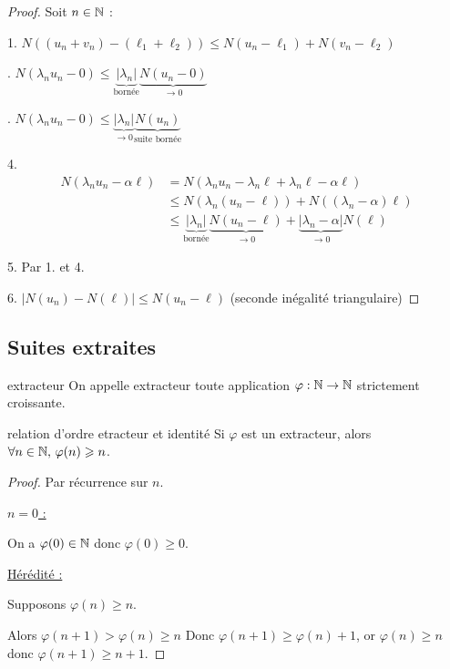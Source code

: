 \begin{proof}
    Soit $n \in \mathbb{N}$ :

    1. $N((u_n + v_n) - (\ell_1 + \ell_2)) \leqslant N(u_n - \ell_1) + N(v_n - \ell_2)$

    . $N(\lambda_n u_n- 0) \leqslant \underbrace{|\lambda_n|}_{\text{bornée}} \underbrace{N(u_n - 0)}_{\rightarrow 0}$

    . $N(\lambda_n u_n - 0) \leqslant \underbrace{|\lambda_n|}_{\rightarrow 0} \underbrace{N(u_n)}_{\text{suite bornée}}$

    4. \begin{align*}
        N(\lambda_n u_n - \alpha \ell) & = N(\lambda_n u_n - \lambda_n \ell + \lambda_n \ell - \alpha \ell) \\
        & \leqslant N(\lambda_n (u_n - \ell)) + N((\lambda_n - \alpha) \ell) \\
        & \leqslant \underbrace{|\lambda_n|}_{\text{bornée}} \underbrace{N(u_n - \ell)}_{\rightarrow 0} + \underbrace{|\lambda_n - \alpha|}_{\rightarrow 0} N(\ell) 
    \end{align*}


    5. Par 1. et 4.

    6. $|N(u_n) - N(\ell)| \leqslant N(u_n - \ell)$ (seconde inégalité triangulaire)

\end{proof}


\subsection{Suites extraites}

\begin{definition}{extracteur}{}
    On appelle extracteur toute application $\varphi : \mathbb{N} \to \mathbb{N}$ strictement croissante.
\end{definition}

\begin{proposition}{relation d'ordre etracteur et identité}{}
    Si $\varphi$ est un extracteur, alors $\forall n \in \mathbb{N}, \, \varphi(n) \geqslant n$.
\end{proposition}



\begin{proof}
    Par récurrence sur $n$. 

    \qquad \uline{$n = 0$ :}

    \avspace On a $\varphi(0) \in \mathbb{N}$ donc $\varphi(0) \geqslant 0$.

    \avspace \qquad \uline{Hérédité :}

    \avspace Supposons $\varphi(n) \geqslant n$.

    Alors $\varphi(n + 1) > \varphi(n) \geqslant n$ 
    Donc $\varphi(n + 1) \geqslant \varphi(n) + 1$, or $\varphi(n) \geqslant n$ donc
    $\varphi(n + 1) \geqslant n + 1$.

\end{proof}


